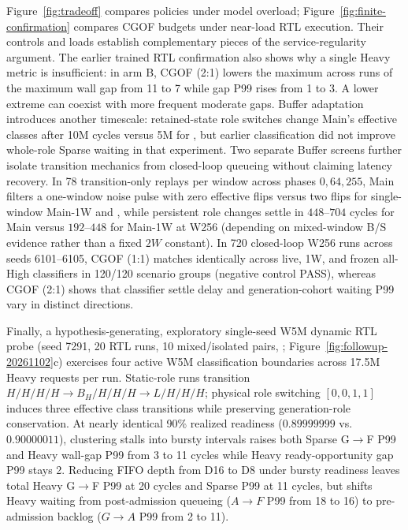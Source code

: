Figure~\ref{fig:tradeoff} compares policies under model overload; Figure~\ref{fig:finite-confirmation} compares CGOF budgets under near-load RTL execution. Their controls and loads establish complementary pieces of the service-regularity argument. The earlier trained RTL confirmation also shows why a single Heavy metric is insufficient: in arm B, CGOF (2:1) lowers the maximum across runs of the maximum wall gap from 11 to 7 while gap P99 rises from 1 to 3. A lower extreme can coexist with more frequent moderate gaps. Buffer adaptation introduces another timescale: retained-state role switches change Main's effective classes after 10M cycles versus 5M for \Alg, but earlier classification did not improve whole-role Sparse waiting in that experiment. Two separate  Buffer screens further isolate transition mechanics from closed-loop queueing without claiming latency recovery. In 78 transition-only replays per window across phases $0,64,255$, Main filters a one-window noise pulse with zero effective flips versus two flips for single-window Main-1W and \Alg, while persistent role changes settle in $448\text{--}704$ cycles for Main versus $192\text{--}448$ for Main-1W at W256 (depending on mixed-window B/S evidence rather than a fixed $2W$ constant). In 720 closed-loop W256 runs across seeds 6101--6105, CGOF (1:1) matches identically across live, 1W, and frozen all-High classifiers in 120/120 scenario groups (negative control PASS), whereas CGOF (2:1) shows that classifier settle delay and generation-cohort waiting P99 vary in distinct directions.

Finally, a hypothesis-generating, exploratory single-seed W5M dynamic RTL probe (seed 7291, 20 RTL runs, 10 mixed/isolated pairs, ; Figure~\ref{fig:followup-20261102}c) exercises four active W5M classification boundaries across 17.5M Heavy requests per run. Static-role runs transition $H/H/H/H\rightarrow B_H/H/H/H\rightarrow L/H/H/H$; physical role switching $[0,0,1,1]$ induces three effective class transitions while preserving generation-role conservation. At nearly identical 90\% realized readiness ($0.89999999$ vs.\ $0.90000011$), clustering stalls into bursty intervals raises both Sparse G$\rightarrow$F P99 and Heavy wall-gap P99 from 3 to 11 cycles while Heavy ready-opportunity gap P99 stays 2. Reducing FIFO depth from D16 to D8 under bursty readiness leaves total Heavy G$\rightarrow$F P99 at 20 cycles and Sparse P99 at 11 cycles, but shifts Heavy waiting from post-admission queueing ($A\rightarrow F$ P99 from 18 to 16) to pre-admission backlog ($G\rightarrow A$ P99 from 2 to 11).

